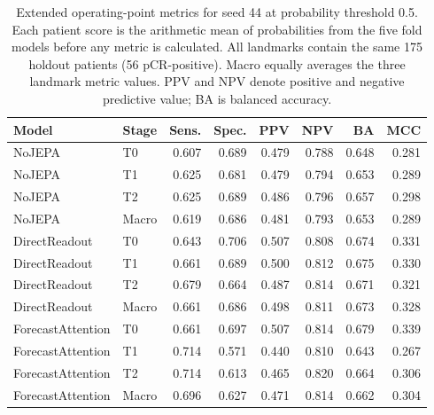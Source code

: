 \begin{table}[t]
\centering
\small
\caption{Extended operating-point metrics for seed 44 at probability threshold 0.5. Each patient score is the arithmetic mean of probabilities from the five fold models before any metric is calculated. All landmarks contain the same 175 holdout patients (56 pCR-positive). Macro equally averages the three landmark metric values. PPV and NPV denote positive and negative predictive value; BA is balanced accuracy.}
\label{tab:extended_operating}
\begin{tabular}{llrrrrrr}
\toprule
Model & Stage & Sens. & Spec. & PPV & NPV & BA & MCC \\
\midrule
NoJEPA & T0 & 0.607 & 0.689 & 0.479 & 0.788 & 0.648 & 0.281 \\
NoJEPA & T1 & 0.625 & 0.681 & 0.479 & 0.794 & 0.653 & 0.289 \\
NoJEPA & T2 & 0.625 & 0.689 & 0.486 & 0.796 & 0.657 & 0.298 \\
NoJEPA & Macro & 0.619 & 0.686 & 0.481 & 0.793 & 0.653 & 0.289 \\
\midrule
DirectReadout & T0 & 0.643 & 0.706 & 0.507 & 0.808 & 0.674 & 0.331 \\
DirectReadout & T1 & 0.661 & 0.689 & 0.500 & 0.812 & 0.675 & 0.330 \\
DirectReadout & T2 & 0.679 & 0.664 & 0.487 & 0.814 & 0.671 & 0.321 \\
DirectReadout & Macro & 0.661 & 0.686 & 0.498 & 0.811 & 0.673 & 0.328 \\
\midrule
ForecastAttention & T0 & 0.661 & 0.697 & 0.507 & 0.814 & 0.679 & 0.339 \\
ForecastAttention & T1 & 0.714 & 0.571 & 0.440 & 0.810 & 0.643 & 0.267 \\
ForecastAttention & T2 & 0.714 & 0.613 & 0.465 & 0.820 & 0.664 & 0.306 \\
ForecastAttention & Macro & 0.696 & 0.627 & 0.471 & 0.814 & 0.662 & 0.304 \\
\bottomrule
\end{tabular}
\end{table}
